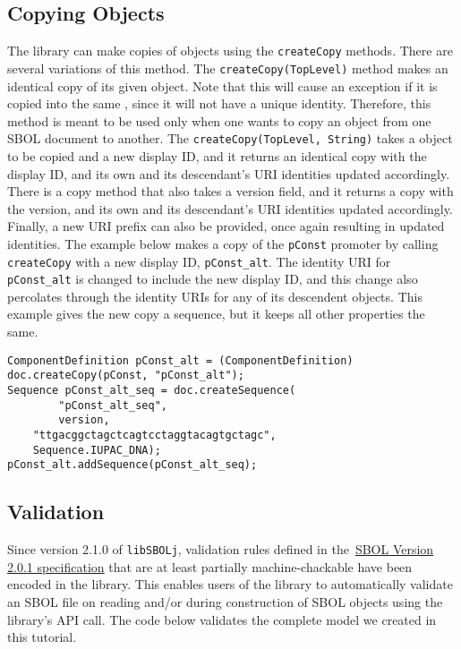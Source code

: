 \subsection*{Copying Objects}
The library can make copies of  objects using the \lstinline+createCopy+ methods.  There are several variations of this method. The \lstinline+createCopy(TopLevel)+ method makes an identical copy of its given  object. Note that this will cause an exception if it is copied into the same , since it will not have a unique identity. Therefore, this method is meant to be used only when one wants to copy an object from one SBOL document to another. The \lstinline+createCopy(TopLevel, String)+ takes a  object to be copied and a new display ID, and it returns an identical copy with the display ID, and its own and its descendant's URI identities updated accordingly. There is a copy method that also takes a version field, and it returns a copy with the version, and its own and its descendant's URI identities updated accordingly.  Finally, a new URI prefix can also be provided, once again resulting in updated identities. The example below makes a copy of the
\lstinline+pConst+ promoter by calling \lstinline+createCopy+ with a new display ID, \lstinline+pConst_alt+. The identity URI for \lstinline+pConst_alt+ is changed to include the new display ID, and this change also percolates through the identity URIs for any of its descendent objects.  This example gives the new copy a sequence, but it keeps all other properties the same. 

\vspace{\abovedisplayskip}
\begin{minipage}{0.95\textwidth} 
\begin{lstlisting}
ComponentDefinition pConst_alt = (ComponentDefinition) doc.createCopy(pConst, "pConst_alt");
Sequence pConst_alt_seq = doc.createSequence(
        "pConst_alt_seq", 
        version, 
	"ttgacggctagctcagtcctaggtacagtgctagc",
	Sequence.IUPAC_DNA); 
pConst_alt.addSequence(pConst_alt_seq);
\end{lstlisting}
\end{minipage}

\subsection*{Validation}
Since version 2.1.0 of {\tt libSBOLj}, validation rules defined in
the~\href{http://sbolstandard.org/downloads/specification-data-model-2-0/}{SBOL
  Version 2.0.1 specification} that are at least partially
machine-chackable have been encoded in the library. This enables users
of the library to automatically validate an SBOL file on reading
and/or during construction of SBOL objects using the library's API
call. The code below validates the complete model we created in this
tutorial. 

